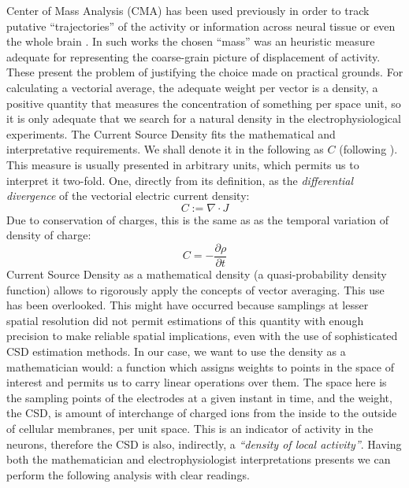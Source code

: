 \documentclass[12pt]{article}
\begin{document}
Center of Mass Analysis (CMA) has been used previously in order to track putative  ``trajectories'' of the activity or information across neural tissue or even the whole brain \cite{Chao05, Chao07, Manjarrez07, Manjarrez09}. In such works the chosen ``mass'' was an heuristic measure adequate for representing the coarse-grain picture of displacement of activity. These present the problem of justifying the choice made on practical grounds. For calculating a vectorial average, the adequate weight per vector is a density, a positive quantity that measures the concentration of something per space unit, so it is only adequate that we search for a natural density in the electrophysiological experiments. The Current Source Density fits the mathematical and interpretative requirements. We shall denote it in the following as $C$ (following \cite{Potworowski2011}).  This measure is usually presented in arbitrary units, which permits us to interpret it two-fold. One, directly from its definition, as the \emph{differential divergence} of the vectorial electric current density:
\begin{equation}
  C:=\nabla \cdot J
\end{equation}
Due to conservation of charges, this is the same as as the temporal variation of density of charge:
\begin{equation}
  C=-\frac{\partial \rho}{\partial t}
\end{equation}
Current Source Density as a mathematical density (a quasi-probability density function)  allows  to rigorously apply the concepts of vector averaging. This use has been overlooked. This might have occurred because  samplings at lesser spatial resolution did not permit estimations of this quantity with enough precision to make reliable spatial implications, even with the use of sophisticated CSD estimation methods. In our case, we want to use the density as a mathematician would: a function which assigns weights to points in the space of interest and permits us to carry linear operations over them.  The space here is the sampling points of the electrodes at a given instant in time, and the weight, the CSD, is amount of interchange of charged ions from the inside to the outside of cellular membranes, per unit space.  This is an indicator of activity in the neurons, therefore the CSD is also, indirectly, a \emph{``density of local activity''}. Having both
the mathematician and electrophysiologist interpretations presents we can
perform the following analysis with clear readings. 
\end{document}

